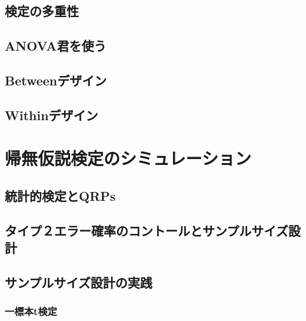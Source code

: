 \documentclass[
  a4paper,
]{ltjsbook}
\begin{document}
\section{検定の多重性}\label{ux691cux5b9aux306eux591aux91cdux6027}

\section{ANOVA君を使う}\label{anovaux541bux3092ux4f7fux3046}

\section{Betweenデザイン}\label{betweenux30c7ux30b6ux30a4ux30f3}

\section{Withinデザイン}\label{withinux30c7ux30b6ux30a4ux30f3}


\chapter{帰無仮説検定のシミュレーション}\label{ux5e30ux7121ux4eeeux8aacux691cux5b9aux306eux30b7ux30dfux30e5ux30ecux30fcux30b7ux30e7ux30f3}

\section{統計的検定とQRPs}\label{ux7d71ux8a08ux7684ux691cux5b9aux3068qrps}

\section{タイプ２エラー確率のコントールとサンプルサイズ設計}\label{ux30bfux30a4ux30d7uxff12ux30a8ux30e9ux30fcux78baux7387ux306eux30b3ux30f3ux30c8ux30fcux30ebux3068ux30b5ux30f3ux30d7ux30ebux30b5ux30a4ux30baux8a2dux8a08}

\section{サンプルサイズ設計の実践}\label{ux30b5ux30f3ux30d7ux30ebux30b5ux30a4ux30baux8a2dux8a08ux306eux5b9fux8df5}

\subsection{一標本t検定}\label{ux4e00ux6a19ux672ctux691cux5b9a}
\end{document}
